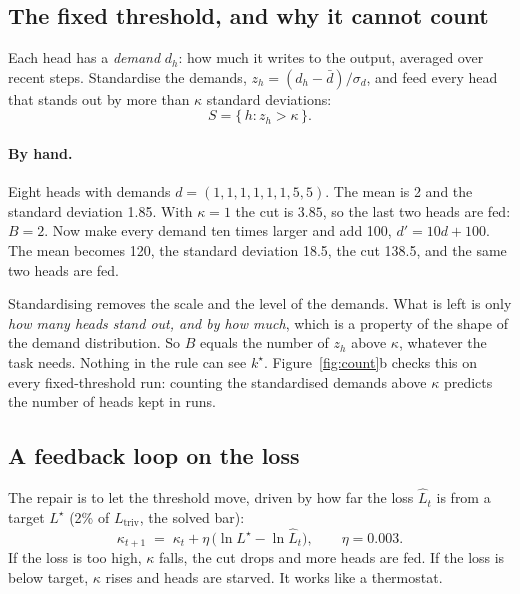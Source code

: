 \documentclass[11pt]{report}
\newcommand{\kstar}{k^\star}
\newcommand{\Ltriv}{L_{\mathrm{triv}}}
\begin{document}
\subsection{The fixed threshold, and why it cannot count}
\label{sec:threshold}

Each head has a \emph{demand} $d_h$: how much it writes to the output, averaged over recent
steps. Standardise the demands, $z_h = (d_h - \bar d)/\sigma_d$, and feed every head that
stands out by more than $\kappa$ standard deviations:
\begin{equation}
  S = \{\, h : z_h > \kappa \,\}.
\end{equation}

\paragraph{By hand.} Eight heads with demands $d = (1,1,1,1,1,1,5,5)$. The mean is 2 and
the standard deviation 1.85. With $\kappa = 1$ the cut is $3.85$, so the last two heads
are fed: $B = 2$. Now make every demand ten times larger and add 100, $d' = 10d + 100$.
The mean becomes 120, the standard deviation 18.5, the cut 138.5, and the same two heads
are fed.

Standardising removes the scale and the level of the demands. What is left is only
\emph{how many heads stand out, and by how much}, which is a property of the shape of the
demand distribution. So $B$ equals the number of $z_h$ above $\kappa$, whatever the task
needs. Nothing in the rule can see $\kstar$. Figure~\ref{fig:count}b checks this on every
fixed-threshold run: counting the standardised demands above $\kappa$ predicts the number
of heads kept in \thThrMatch{} runs.

\subsection{A feedback loop on the loss}
\label{sec:loop}

The repair is to let the threshold move, driven by how far the loss $\widehat L_t$ is from
a target $L^\star$ (2\% of $\Ltriv$, the solved bar):
\begin{equation}
  \kappa_{t+1} \;=\; \kappa_t + \eta\,\bigl(\ln L^\star - \ln \widehat L_t\bigr),
  \qquad \eta = 0.003 .
\end{equation}
If the loss is too high, $\kappa$ falls, the cut drops and more heads are fed. If the loss
is below target, $\kappa$ rises and heads are starved. It works like a thermostat.
\end{document}
